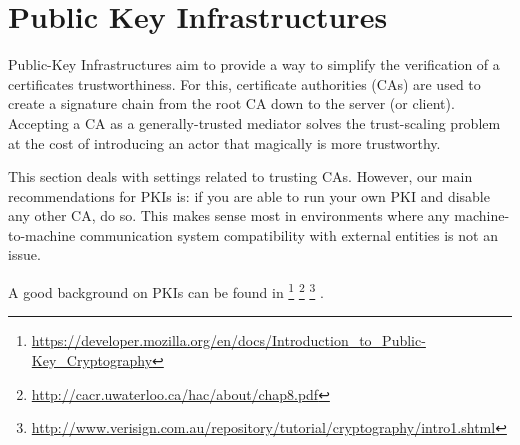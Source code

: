 \section{Public Key Infrastructures}
\label{section:PKIs}

Public-Key Infrastructures aim to provide a way to simplify the verification of
a certificates trustworthiness.  For this, certificate authorities (CAs) are
used to create a signature chain from the root CA down to the server (or client).
Accepting a CA as a generally-trusted mediator solves the trust-scaling problem
at the cost of introducing an actor that magically is more trustworthy.

This section deals with settings related to trusting CAs. However, our main
recommendations for PKIs is: if you are able to run your own PKI and disable
any other CA, do so. This makes sense most in environments where any machine-to-machine
communication system compatibility with external entities is not an issue.

A good background on PKIs can be found in 
\footnote{\url{https://developer.mozilla.org/en/docs/Introduction_to_Public-Key_Cryptography}}
\footnote{\url{http://cacr.uwaterloo.ca/hac/about/chap8.pdf}}
\footnote{\url{http://www.verisign.com.au/repository/tutorial/cryptography/intro1.shtml}}
.



